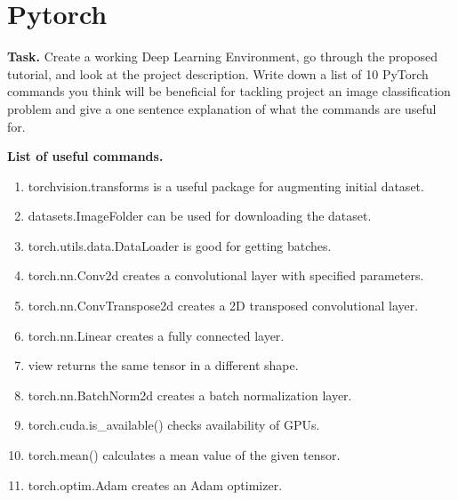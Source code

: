 \documentclass{article}
\begin{document}
\section{Pytorch}
{\bfseries Task.} Create a working Deep Learning Environment, go through the proposed tutorial, and look at the project description.
Write down a list of 10 PyTorch commands you think will be beneficial for tackling project an image classification problem and give a one sentence explanation of what the commands are useful for.

{\bfseries List of useful commands.}
\begin{enumerate}
	\item torchvision.transforms is a useful package for augmenting initial dataset.
	\item datasets.ImageFolder can be used for downloading the dataset.
	\item torch.utils.data.DataLoader is good for getting batches. 
	\item torch.nn.Conv2d creates a convolutional layer with specified parameters.
	\item torch.nn.ConvTranspose2d creates a 2D transposed convolutional layer.
	\item torch.nn.Linear creates a fully connected layer.
	\item view returns the same tensor in a different shape.
	\item torch.nn.BatchNorm2d creates a batch normalization layer.
	\item torch.cuda.is\_available() checks availability of GPUs.
	\item torch.mean() calculates a mean value of the given tensor.
	\item torch.optim.Adam creates an Adam optimizer.
\end{enumerate}
\end{document}
